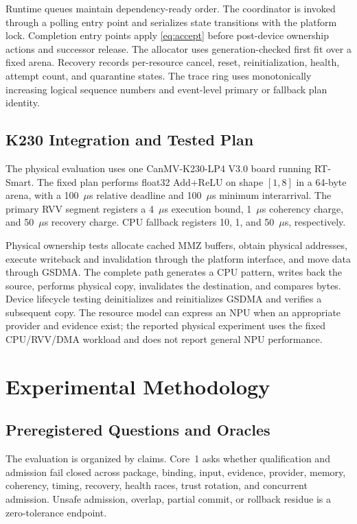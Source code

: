 \documentclass[lettersize,journal]{IEEEtran}
\begin{document}
Runtime queues maintain dependency-ready order. The coordinator is invoked
through a polling entry point and serializes state transitions with the
platform lock. Completion entry points apply \cref{eq:accept} before
post-device ownership actions and successor release. The allocator uses
generation-checked first fit over a fixed arena. Recovery records per-resource
cancel, reset, reinitialization, health, attempt count, and quarantine states.
The trace ring uses monotonically increasing logical sequence numbers and
event-level primary or fallback plan identity.

\subsection{K230 Integration and Tested Plan}
The physical evaluation uses one CanMV-K230-LP4 V3.0 board running RT-Smart.
The fixed plan performs float32 Add+ReLU on shape $[1,8]$ in a 64-byte arena,
with a 100~$\mu$s relative deadline and 100~$\mu$s minimum interarrival. The
primary RVV segment registers a 4~$\mu$s execution bound, 1~$\mu$s coherency
charge, and 50~$\mu$s recovery charge. CPU fallback registers 10, 1, and
50~$\mu$s, respectively.

Physical ownership tests allocate cached MMZ buffers, obtain physical
addresses, execute writeback and invalidation through the platform interface,
and move data through GSDMA. The complete path generates a CPU pattern, writes
back the source, performs physical copy, invalidates the destination, and
compares bytes. Device lifecycle testing deinitializes and reinitializes GSDMA
and verifies a subsequent copy. The resource model can express an NPU when an
appropriate provider and evidence exist; the reported physical experiment uses
the fixed CPU/RVV/DMA workload and does not report general NPU performance.

\section{Experimental Methodology}
\subsection{Preregistered Questions and Oracles}
The evaluation is organized by claims. Core~1 asks whether qualification and
admission fail closed across package, binding, input, evidence, provider,
memory, coherency, timing, recovery, health races, trust rotation, and
concurrent admission. Unsafe admission, overlap, partial commit, or rollback
residue is a zero-tolerance endpoint.
\end{document}

